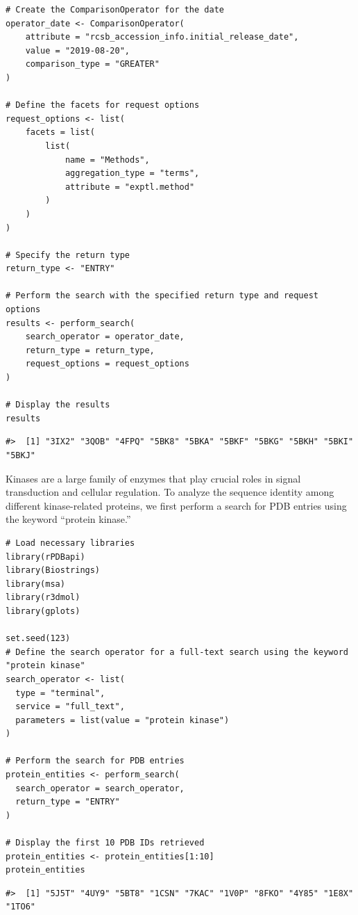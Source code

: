 \begin{verbatim}
# Create the ComparisonOperator for the date
operator_date <- ComparisonOperator(
    attribute = "rcsb_accession_info.initial_release_date",
    value = "2019-08-20",
    comparison_type = "GREATER"
)

# Define the facets for request options
request_options <- list(
    facets = list(
        list(
            name = "Methods",
            aggregation_type = "terms",
            attribute = "exptl.method"
        )
    )
)

# Specify the return type
return_type <- "ENTRY"

# Perform the search with the specified return type and request options
results <- perform_search(
    search_operator = operator_date,
    return_type = return_type,
    request_options = request_options
)

# Display the results
results
\end{verbatim}

\begin{verbatim}
#>  [1] "3IX2" "3QOB" "4FPQ" "5BK8" "5BKA" "5BKF" "5BKG" "5BKH" "5BKI" "5BKJ"
\end{verbatim}

Kinases are a large family of enzymes that play crucial roles in signal transduction and cellular regulation. To analyze the sequence identity among different kinase-related proteins, we first perform a search for PDB entries using the keyword ``protein kinase.''

\begin{verbatim}
# Load necessary libraries
library(rPDBapi)
library(Biostrings)
library(msa)
library(r3dmol)
library(gplots)

set.seed(123)
# Define the search operator for a full-text search using the keyword "protein kinase"
search_operator <- list(
  type = "terminal",
  service = "full_text",
  parameters = list(value = "protein kinase")
)

# Perform the search for PDB entries
protein_entities <- perform_search(
  search_operator = search_operator,
  return_type = "ENTRY"
)

# Display the first 10 PDB IDs retrieved
protein_entities <- protein_entities[1:10]
protein_entities
\end{verbatim}

\begin{verbatim}
#>  [1] "5J5T" "4UY9" "5BT8" "1CSN" "7KAC" "1V0P" "8FKO" "4Y85" "1E8X" "1TO6"
\end{verbatim}

